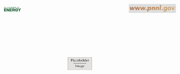 \documentclass[final]{beamer}
\newlength{\sepwid}
\newlength{\onecolwid}
\begin{document}
\begin{frame}[t]
\begin{columns}[t]
  \end{columns} %
  \vspace{-1.5in}
  \begin{columns}[t]
    \begin{column}{\sepwid}
    \end{column} %
    \begin{column}{\sepwid}
    \end{column} %
    \begin{column}{\onecolwid}
      \includegraphics[width=0.4\textwidth,left]{figure/doe.png}
    \end{column}
    \begin{column}{\sepwid}
    \end{column} %
    \begin{column}{\onecolwid}
        \includegraphics[width=0.6\textwidth,height=2.5in,left]{figure/placeholder.jpg}
    \end{column}
    \begin{column}{\sepwid}
    \end{column} %
    \begin{column}{\onecolwid}
      \includegraphics[width=0.5\textwidth,right]{figure/pnnl_web.png}
    \end{column}
    \begin{column}{\sepwid}
    \end{column} %
  \end{columns}
\end{frame} %
\end{document}
